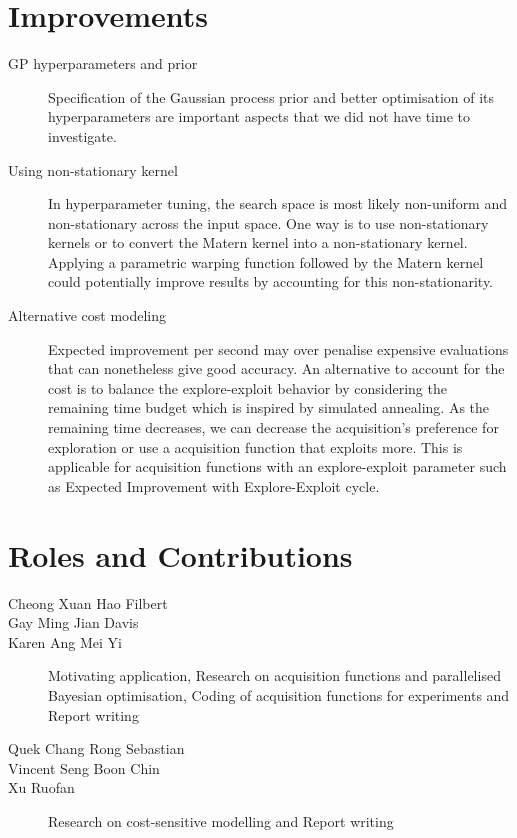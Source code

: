\documentclass[letterpaper]{article}
\begin{document}
\section{Improvements}
\begin{description}
\item [GP hyperparameters and prior] Specification of the Gaussian process prior and better optimisation of its 
hyperparameters are important aspects that we did not have time to investigate.
\item [Using non-stationary kernel] In hyperparameter tuning, the search space is most likely non-uniform and 
non-stationary across the input space. One way is to use non-stationary
kernels or to convert the Matern kernel into a non-stationary kernel.
\cite{shahriari2016taking} Applying a parametric warping
function followed by the Matern kernel could potentially improve results by
accounting for this non-stationarity.
\item [Alternative cost modeling] Expected improvement per second may over penalise expensive evaluations that can nonetheless give good accuracy.
An alternative to account for the cost is to balance the explore-exploit behavior by considering the remaining time budget which is inspired by simulated annealing.
As the remaining time decreases, we can decrease the acquisition's preference for exploration or use a acquisition function that exploits more.
This is applicable for acquisition functions with an explore-exploit parameter such as Expected Improvement with Explore-Exploit cycle.
\end{description}

\section{Roles and Contributions}
\begin{description}
\item [Cheong Xuan Hao Filbert]
\item [Gay Ming Jian Davis]
\item [Karen Ang Mei Yi] Motivating application, Research on acquisition functions
and parallelised Bayesian optimisation, Coding of acquisition functions for experiments and Report writing
\item [Quek Chang Rong Sebastian]
\item [Vincent Seng Boon Chin]
\item [Xu Ruofan] Research on cost-sensitive modelling and Report writing
\end{description}



\end{document}
